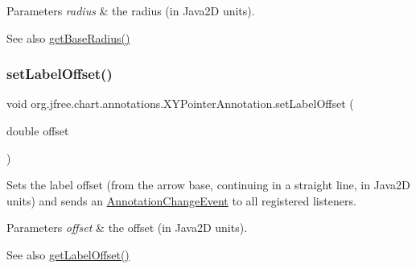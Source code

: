 \begin{DoxyParams}{Parameters}
{\em radius} & the radius (in Java2D units).\\
\hline
\end{DoxyParams}
\begin{DoxySeeAlso}{See also}
\mbox{\hyperlink{classorg_1_1jfree_1_1chart_1_1annotations_1_1_x_y_pointer_annotation_a7dd9c99999b7faf6911d9fc400e809f9}{get\+Base\+Radius()}} 
\end{DoxySeeAlso}
\mbox{\label{classorg_1_1jfree_1_1chart_1_1annotations_1_1_x_y_pointer_annotation_a61ee30840b0737c260e55b00082e207c}} 
\subsubsection{\texorpdfstring{set\+Label\+Offset()}{setLabelOffset()}}
{\footnotesize\ttfamily void org.\+jfree.\+chart.\+annotations.\+X\+Y\+Pointer\+Annotation.\+set\+Label\+Offset (\begin{DoxyParamCaption}\item[{double}]{offset }\end{DoxyParamCaption})}

Sets the label offset (from the arrow base, continuing in a straight line, in Java2D units) and sends an \mbox{\hyperlink{}{Annotation\+Change\+Event}} to all registered listeners.


\begin{DoxyParams}{Parameters}
{\em offset} & the offset (in Java2D units).\\
\hline
\end{DoxyParams}
\begin{DoxySeeAlso}{See also}
\mbox{\hyperlink{classorg_1_1jfree_1_1chart_1_1annotations_1_1_x_y_pointer_annotation_aaced523c72b3024fad2fcd423eaccd7c}{get\+Label\+Offset()}} 
\end{DoxySeeAlso}
\mbox{\label{classorg_1_1jfree_1_1chart_1_1annotations_1_1_x_y_pointer_annotation_a35017408da6404615081e0bd00a75578}} 
